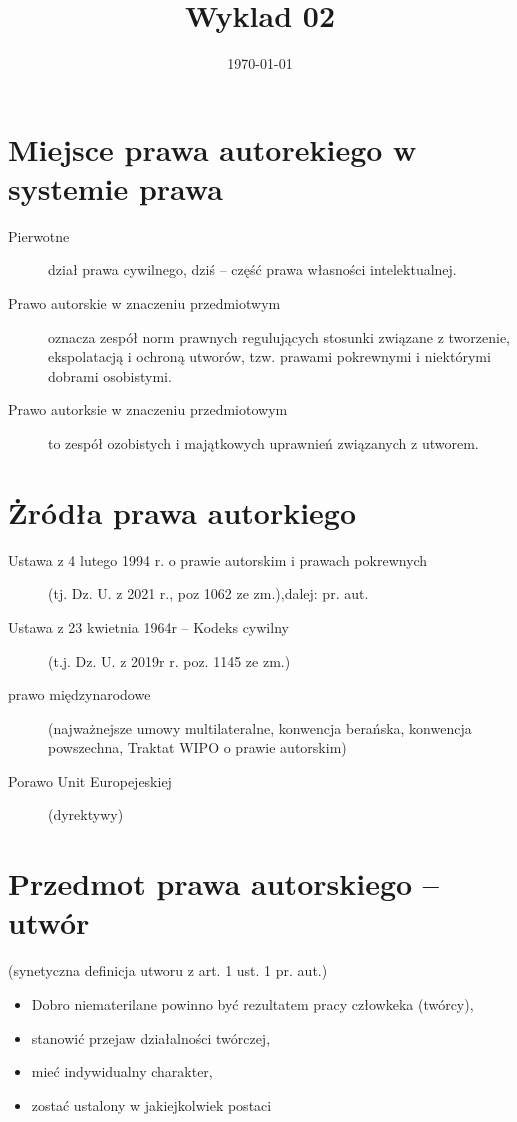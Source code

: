 \documentclass[11pt]{article}
\author{\textcopyleft}
\date{\today}
\title{Wyklad 02}
\begin{document}
\maketitle
\tableofcontents

\section{Miejsce prawa autorekiego w systemie prawa}
\label{sec:orgf18ea09}
\begin{description}
\item[{Pierwotne}] dział prawa cywilnego, dziś -- część prawa własności intelektualnej.
\item[{Prawo autorskie w znaczeniu przedmiotwym}] oznacza zespół norm prawnych regulujących stosunki związane z tworzenie, ekspolatacją i ochroną utworów, tzw. prawami pokrewnymi i niektórymi dobrami osobistymi.
\item[{Prawo autorksie w znaczeniu przedmiotowym}] to zespół ozobistych i majątkowych uprawnień związanych z utworem.
\end{description}
\section{Żródła prawa autorkiego}
\label{sec:org0af17dd}
\begin{description}
\item[{Ustawa z 4 lutego 1994 r. o prawie autorskim i prawach pokrewnych}] (tj. Dz. U. z 2021 r., poz 1062 ze zm.),dalej: pr. aut.
\item[{Ustawa z 23 kwietnia 1964r -- Kodeks cywilny}] (t.j. Dz. U. z 2019r r. poz. 1145 ze zm.)
\item[{prawo międzynarodowe}] (najważnejsze umowy multilateralne, konwencja berańska, konwencja powszechna, Traktat WIPO o prawie autorskim)
\item[{Porawo Unit Europejeskiej}] (dyrektywy)
\end{description}
\section{Przedmot prawa autorskiego -- utwór}
\label{sec:org6581af4}
(synetyczna definicja utworu z art. 1 ust. 1 pr. aut.)
\begin{itemize}
\item Dobro niematerilane powinno być rezultatem pracy człowkeka (twórcy),
\item stanowić przejaw działalności twórczej,
\item mieć indywidualny charakter,
\item zostać ustalony w jakiejkolwiek postaci
\end{itemize}
\end{document}
